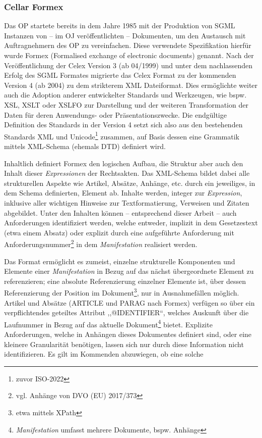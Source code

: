 \subsubsection{Cellar Formex}

    Das \acf{OP} startete bereits in dem Jahre 1985 mit der Produktion von \ac{SGML} Instanzen von -- im \ac{OJ} veröffentlichten -- Dokumenten, um den Austausch mit Auftragnehmern des \ac{OP} zu vereinfachen. \cite[75]{eu_cellar, eu_fmx4_intro}
    Diese verwendete Spezifikation hierfür wurde Formex (Formalised exchange of electronic documents) genannt.
    Nach der Veröffentlichung der Celex Version 3 (ab 04/1999) und unter dem nachlassenden Erfolg des \ac{SGML} Formates migrierte das Celex Format zu der kommenden Version 4 (ab 2004) zu dem strikterem \ac{XML} Dateiformat.
    Dies ermöglichte weiter auch die Adoption anderer entwickelter Standards und Werkzeugen, wie bspw. \ac{XSL}, \ac{XSLT} oder \ac{XSLFO} zur Darstellung und der weiteren Transformation der Daten für deren Anwendungs- oder Präsentationszwecke.
    Die endgültige Definition des Standards in der Version 4 setzt sich also aus den bestehenden Standards \ac{XML} und Unicode\footnote{zuvor ISO-2022} zusammen, auf Basis dessen eine Grammatik mittels \ac{XML}-Schema (ehemals \ac{DTD}) definiert wird. \cite{eu_fmx4_intro}
    
    \medskip
    Inhaltlich definiert Formex den logischen Aufbau, die Struktur aber auch den Inhalt  dieser \textit{Expressionen} der Rechtsakten.
    Das \ac{XML}-Schema bildet dabei alle strukturellen Aspekte wie Artikel, Absätze, Anhänge, etc. durch ein jeweiliges, in dem Schema definierten, Element ab. 
    Inhalte werden, integer zur \textit{Expression}, inklusive aller wichtigen Hinweise zur Textformatierung, Verweisen und Zitaten abgebildet. 
    Unter den Inhalten können -- entsprechend dieser Arbeit -- auch Anforderungen identifiziert werden, welche entweder, implizit in dem Gesetzestext (etwa einem Absatz) oder explizit durch eine aufgeführte Anforderung mit Anforderungsnummer\footnote{vgl. Anhänge von \acs{DVO} (\acs{EU}) 2017/373} in dem \textit{Manifestation} realisiert werden.

    \medskip
    Das Format ermöglicht es zumeist, einzelne strukturelle Komponenten und Elemente einer \textit{Manifestation} in Bezug auf das nächst übergeordnete Element zu referenzieren; eine absolute Referenzierung einzelner Elemente ist, über dessen Referenzierung der Position im Dokument\footnote{etwa mittels XPath}, nur in Ausnahmefällen möglich.
    Artikel und Absätze (\textsf{ARTICLE} und \textsf{PARAG} nach Formex) verfügen so über ein verpflichtendes geteiltes Attribut ,,\textsf{@IDENTIFIER}``, welches Auskunft über die Laufnummer in Bezug auf das aktuelle Dokument\footnote{\textit{Manifestation} umfasst mehrere Dokumente, bspw. Anhänge} bietet. 
    Explizite Anforderungen, welche in Anhängen dieses Dokumentes definiert sind, oder eine kleinere Granularität benötigen, lassen sich nur durch diese Information nicht identifizieren.
    Es gilt im Kommenden abzuwiegen, ob eine solche 

